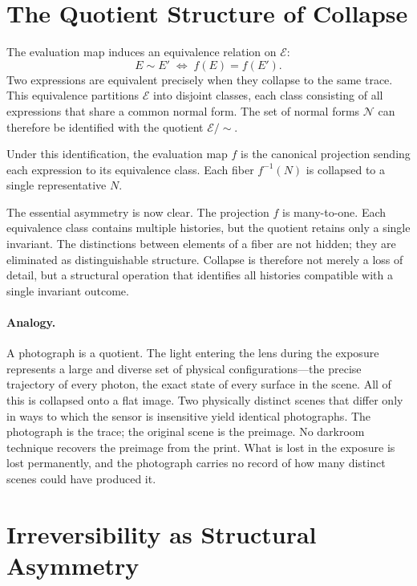 \documentclass[12pt, oneside]{amsbook}
\theoremstyle{plain}
\theoremstyle{definition}
\theoremstyle{remark}
\newcommand{\Expr}{\mathcal{E}}
\newcommand{\NF}{\mathcal{N}}
\newcommand{\evalf}{f}
\newcommand{\tequiv}{\sim}
\newcommand{\preimgset}[1]{f^{-1}(#1)}
\begin{document}
\section{The Quotient Structure of Collapse}
\label{sec:collapse:topology}

The evaluation map induces an equivalence relation on $\Expr$:
\[
  E \tequiv E' \;\Longleftrightarrow\; \evalf(E) = \evalf(E').
\]
Two expressions are equivalent precisely when they collapse to the same trace.
This equivalence partitions $\Expr$ into disjoint classes, each class
consisting of all expressions that share a common normal form. The set of
normal forms $\NF$ can therefore be identified with the quotient
$\Expr / {\tequiv}$.

Under this identification, the evaluation map $\evalf$ is the canonical
projection sending each expression to its equivalence class. Each fiber
$\preimgset{N}$ is collapsed to a single representative $N$.

The essential asymmetry is now clear. The projection $\evalf$ is many-to-one.
Each equivalence class contains multiple histories, but the quotient retains
only a single invariant. The distinctions between elements of a fiber are not
hidden; they are eliminated as distinguishable structure. Collapse is therefore
not merely a loss of detail, but a structural operation that identifies all
histories compatible with a single invariant outcome.

\paragraph{Analogy.}
A photograph is a quotient. The light entering the lens during the exposure represents a large and diverse set of physical configurations---the precise trajectory of every photon, the exact state of every surface in the scene. All of this is collapsed onto a flat image. Two physically distinct scenes that differ only in ways to which the sensor is insensitive yield identical photographs. The photograph is the trace; the original scene is the preimage. No darkroom technique recovers the preimage from the print. What is lost in the exposure is lost permanently, and the photograph carries no record of how many distinct scenes could have produced it.

\section{Irreversibility as Structural Asymmetry}
\label{sec:collapse:asymmetry}
\end{document}
